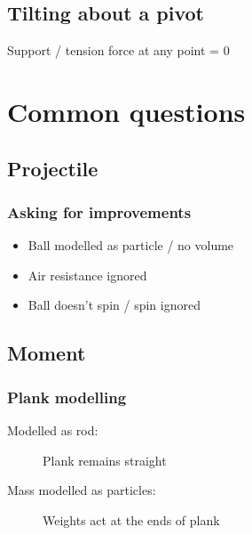 \documentclass[A4paper]{article}
\begin{document}
	\subsection{Tilting about a pivot}
	Support / tension force at any point = 0
	

	\pagebreak

	\section{Common questions}
	\subsection{Projectile}
	\subsubsection{Asking for improvements}
	\begin{itemize}
		\item Ball modelled as particle / no volume
		\item Air resistance ignored
		\item Ball doesn't spin / spin ignored
	\end{itemize}
	\subsection{Moment}
	\subsubsection{Plank modelling}
	\begin{description}
		\item[Modelled as rod: ] Plank remains straight
		\item[Mass modelled as particles: ] Weights act at the ends of plank
	\end{description}
	
	
	
	
\end{document}
